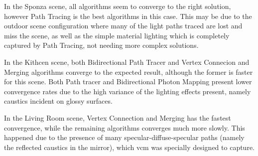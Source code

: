 In the Sponza scene, all algorithms seem to converge to the right solution, however Path Tracing is the best algorithms in this case. This may be due to the outdoor scene configuration where many of the light paths traced are lost and miss the scene, as well as the simple material lighting which is completely captured by Path Tracing, not needing more complex solutions.

In the Kithcen scene, both Bidirectional Path Tracer and Vertex Connecion and Merging algorithms converge to the expected result, although the former is faster for this scene. Both Path tracer and Bidirectional Photon Mapping present lower convergence rates due to the high variance of the lighting effects present, namely caustics incident on glossy surfaces.

In the Living Room scene, Vertex Connection and Merging has the fastest convergence, while the remaining algorithms converges much more slowly. This happened due to the presence of many specular-diffuse-specular paths (namely the reflected caustics in the mirror), which \gls{vcm} was specially designed to capture.